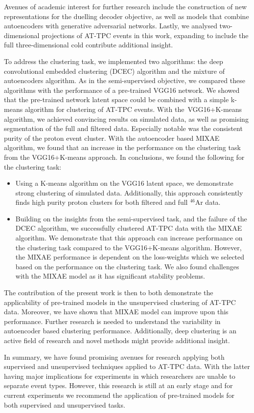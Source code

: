 Avenues of academic interest for further research include the construction of new representations for the duelling decoder objective, as well as models that combine autoencoders with generative adversarial networks.  Lastly, we analysed two-dimensional projections of AT-TPC events in this work, expanding to include the full three-dimensional cold contribute additional insight.

To address the clustering task, we implemented two algorithms: the deep convolutional embedded clustering (DCEC) algorithm and the mixture of autoencoders algorithm. As in the semi-supervised objective, we compared these algorithms with the performance of a pre-trained VGG16 network. We showed that the pre-trained network latent space could be combined with a simple k-means algorithm for clustering of AT-TPC events. With the VGG16+K-means algorithm, we achieved convincing results on simulated data, as well as promising segmentation of the full and filtered data. Especially notable was the consistent purity of the proton event cluster. With the autoencoder based MIXAE  algorithm, we found that an increase in the performance on the clustering task from the VGG16+K-means approach.  In conclusions, we found the following for the clustering task:

\begin{itemize}
\item Using a K-means algorithm on the VGG16 latent space, we demonstrate strong clustering of simulated data. Additionally, this approach consistently finds high purity proton clusters for both filtered and full ${}^{46}$Ar data.
\item Building on the insights from the semi-supervised task, and the failure of the DCEC algorithm,  we successfully clustered AT-TPC data with the MIXAE algorithm. We demonstrate that this approach can increase performance on the clustering task compared to the VGG16+K-means algorithm.  However, the MIXAE performance is dependent on the loss-weights which we selected based on the performance on the clustering task. We also found challenges with the MIXAE model as it has significant stability problems. 
\end{itemize}

The contribution of the present work is then to both demonstrate the applicability of pre-trained models in the unsupervised clustering of AT-TPC data. Moreover, we have shown that MIXAE model can improve upon this performance. Further research is needed to understand the variability in autoencoder based clustering performance. Additionally, deep clustering is an active field of research and novel methods might provide additional insight. 

In summary, we have found promising avenues for research applying both supervised and unsupervised techniques applied to AT-TPC data. With the latter having major implications for experiments in which researchers are unable to separate event types. However, this research is still at an early stage and for current experiments we recommend the application of pre-trained models for both supervised and unsupervised tasks.
